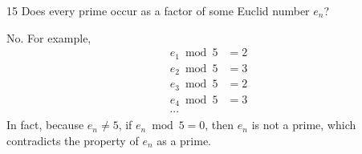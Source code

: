 \documentclass[a4paper,12pt]{article}
\makeatletter
\newtheorem*{solution}{Solution}
\theoremstyle{definition}
\renewenvironment{solution}[1][Solution] {\par\pushQED{\qed}\normalfont\topsep6\p@\@plus6\p@\relax\trivlist\item[\hskip\labelsep\bfseries#1\@addpunct{.}]\ignorespaces}{\popQED\endtrivlist\@endpefalse} \makeatother
\newenvironment{problems}{\begin{list}{}{\renewcommand{\makelabel}[1]{\textbf{##1}\hfil}}}{\end{list}}
\makeatother
\begin{document}
\begin{problems}
    \item[15] Does every prime occur as a factor of some Euclid number $e_n$?
    \begin{solution}
        No. For example,
        \begin{align*}
            e_1 \bmod 5 &= 2\\
            e_2 \bmod 5 &= 3\\
            e_3 \bmod 5 &= 2\\
            e_4 \bmod 5 &= 3\\
            \cdots
        \end{align*}
        In fact, because $e_n\neq 5$, if $e_n\bmod 5=0$, then $e_n$ is not a prime, which contradicts the property of $e_n$ as a prime.
    \end{solution} 
\end{problems}
\end{document}
